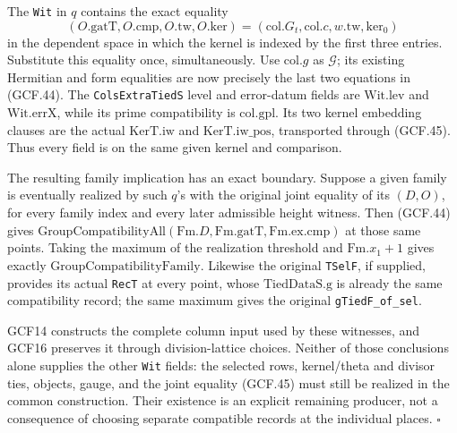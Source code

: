 \documentclass[11pt,a4paper]{article}
\numberwithin{equation}{section}
\theoremstyle{remark}\newtheorem{remark}[theorem]{Remark}
\begin{document}
The \texttt{Wit} in \(q\) contains the exact equality
\[
 (O.\mathrm{gatT},O.\mathrm{cmp},O.\mathrm{tw},O.\mathrm{ker})
       =(\mathrm{col}.G_t,\mathrm{col}.c,w.\mathrm{tw},\mathrm{ker}_0)
 \tag{GCF.45}
\]
in the dependent space in which the kernel is indexed by the first
three entries.  Substitute this equality once, simultaneously.  Use
\(\mathrm{col}.g\) as \(\mathcal G\); its existing Hermitian and
form equalities are now precisely the last two equations in
(GCF.44).  The \texttt{Cols\allowbreak Extra\allowbreak Tied\allowbreak S} level and error-datum fields
are \(\mathrm{Wit.lev}\) and \(\mathrm{Wit.errX}\), while its
prime compatibility is \(\mathrm{col.gpl}\).  Its two kernel
embedding clauses are the actual \(\mathrm{KerT.iw}\) and
\(\mathrm{KerT.iw\_\allowbreak pos}\), transported through (GCF.45).
Thus every field is on the same given kernel and comparison.

The resulting family implication has an exact boundary.  Suppose a
given family is eventually realized by such \(q\)'s with the
original joint equality of its \((D,O)\), for every family index
and every later admissible height witness.  Then (GCF.44) gives
\(\mathrm{GroupCompatibilityAll}(\mathrm{Fm}.D,
\mathrm{Fm}.\mathrm{gatT},\mathrm{Fm}.\mathrm{ex.cmp})\) at
those same points.  Taking the maximum of the realization threshold
and \(\mathrm{Fm}.x_1+1\) gives exactly
\(\mathrm{GroupCompatibilityFamily}\).  Likewise the original
\texttt{TSel\allowbreak F}, if supplied, provides its actual \texttt{Rec\allowbreak T}
at every point, whose \(\mathrm{TiedDataS.g}\) is already the
same compatibility record; the same maximum gives the original
\texttt{g\allowbreak Tied\allowbreak F\_\allowbreak of\_\allowbreak sel}.

GCF14 constructs the complete column input used by these witnesses,
and GCF16 preserves it through division-lattice choices.  Neither
of those conclusions alone supplies the other \texttt{Wit} fields:
the selected rows, kernel/theta and divisor ties, objects, gauge,
and the joint equality (GCF.45) must still be realized in the common
construction.  Their existence is an explicit remaining producer,
not a consequence of choosing separate compatible records at the
individual places.
\hfill\(\square\)

\end{document}
